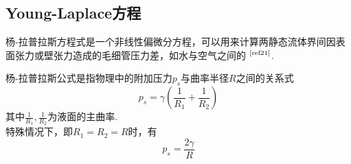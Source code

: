 \documentclass[a4paper,12pt]{article}%
\begin{document}
\subsection{Young-Laplace方程}
\begin{spacing}{1.528}%
杨-拉普拉斯方程式是一个非线性偏微分方程，可以用来计算两静态流体界间因表面张力或壁张力造成的毛细管压力差，如水与空气之间的
$^\text{\cite{ref21}}$. 

杨-拉普拉斯公式是指物理中的附加压力$p_s$与曲率半径$R$之间的关系式
\begin{equation}
    p_s=\gamma\left(\frac{1}{R_1}+\frac{1}{R_2}\right)\label{young}
\end{equation}
其中$\frac{1}{R_1},\frac{1}{R_2}$为液面的主曲率. \\特殊情况下，即$R_1=R_2=R$时，有
\begin{equation}
    p_s=\frac{2\gamma}{R}\label{ps}
\end{equation}
\end{spacing}
\end{document}

